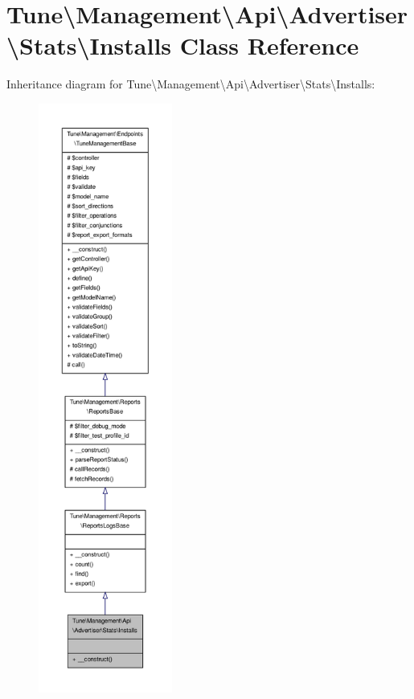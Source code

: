 \hypertarget{classTune_1_1Management_1_1Api_1_1Advertiser_1_1Stats_1_1Installs}{\section{Tune\textbackslash{}Management\textbackslash{}Api\textbackslash{}Advertiser\textbackslash{}Stats\textbackslash{}Installs Class Reference}
\label{classTune_1_1Management_1_1Api_1_1Advertiser_1_1Stats_1_1Installs}
}


Inheritance diagram for Tune\textbackslash{}Management\textbackslash{}Api\textbackslash{}Advertiser\textbackslash{}Stats\textbackslash{}Installs\-:
\nopagebreak
\begin{figure}[H]
\begin{center}
\leavevmode
\includegraphics[height=550pt]{classTune_1_1Management_1_1Api_1_1Advertiser_1_1Stats_1_1Installs__inherit__graph}
\end{center}
\end{figure}


